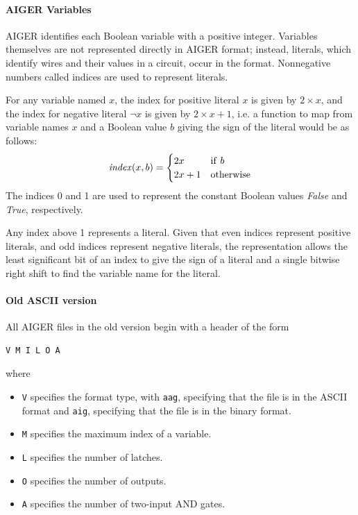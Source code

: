 \documentclass[12pt,a4paper,twoside,openright]{report}
\begin{document}
\paragraph{AIGER Variables}{
AIGER identifies each Boolean variable with a positive integer.
Variables themselves are not represented directly in AIGER format; instead, literals,
which identify wires and their values in a circuit,
occur in the format. Nonnegative numbers called indices are used to represent literals.

For any variable named $x$, the index for positive literal $x$ is given by
$2 \times x$, and the index for negative literal $\neg x$ is given by
$2 \times x + 1$, i.e. a function to map from variable names $x$ and a Boolean
value $b$ giving the sign of the literal would be as follows:
$${\it index}(x, b) =
\begin{cases}
2x & {\rm if}~b \\
2x + 1 & {\rm otherwise}
\end{cases}$$
The indices 0 and 1 are used to represent the constant Boolean values {\it False}
and {\it True}, respectively.

Any index above 1 represents a literal. 
Given that even indices represent positive literals, and odd indices
represent negative literals, the representation allows
the least significant bit of an index to give the sign of a literal
and a single bitwise right shift to find the variable name for the literal.

\paragraph{Old ASCII version}{
All AIGER files in the old version begin with a header of the form
\begin{verbatim}
V M I L O A
\end{verbatim}
where
\begin{itemize}
\item \verb,V, specifies the format type, with \verb,aag,, specifying that the file is in the ASCII format and \verb,aig,, specifying that the file is in the binary format.
\item \verb,M, specifies the maximum index of a variable.
\item \verb,L, specifies the number of latches.
\item \verb,O, specifies the number of outputs.
\item \verb,A, specifies the number of two-input AND gates.
\end{itemize}

}}
\end{document}

